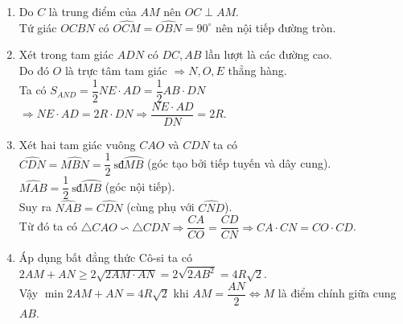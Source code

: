 \begin{ex}
{\begin{center}
	\end{center}
	\begin{enumerate}
	\item Do $C$ là trung điểm của $AM$ nên $OC\perp AM$.\\
	Tứ giác $OCBN$ có $\widehat{OCM}=\widehat{OBN}=90^\circ$ nên nội tiếp đường tròn.
	\item Xét trong tam giác $ADN$ có $DC, AB$ lần lượt là các đường cao.\\
	Do đó $O$ là trực tâm tam giác $\Rightarrow N,O,E$ thẳng hàng.\\
	Ta có $S_{AND}=\dfrac{1}{2}NE\cdot AD=\dfrac{1}{2}AB\cdot DN$\\
	$\Rightarrow NE\cdot AD=2R\cdot DN\Rightarrow \dfrac{NE\cdot AD}{DN}=2R$.
	\item Xét hai tam giác vuông $CAO$ và $CDN$ ta có\\
	$\widehat{CDN}=\widehat{MBN}=\dfrac{1}{2}\ \textrm{sđ}\wideparen{MB}$  (góc tạo bởi tiếp tuyến và dây cung).\\
	$\widehat{MAB}=\dfrac{1}{2}\ \textrm{sđ}\wideparen{MB}$ (góc nội tiếp).\\
	Suy ra $\widehat{NAB}=\widehat{CDN}$ (cùng phụ với $\widehat{CND}$).\\
	Từ đó ta có $\triangle CAO\backsim \triangle CDN\Rightarrow \dfrac{CA}{CO}=\dfrac{CD}{CN}\Rightarrow CA\cdot CN=CO\cdot CD$.
	\item Áp dụng bất đẳng thức Cô-si ta có\\
	$2AM+AN\ge 2\sqrt{2AM\cdot AN}=2\sqrt{2AB^2}=4R\sqrt{2}$.\\
	Vậy $\min 2AM+AN=4R\sqrt{2}$ khi $AM=\dfrac{AN}{2}\Leftrightarrow M$ là điểm chính giữa cung $AB$.
	\end{enumerate}
	}
\end{ex}
